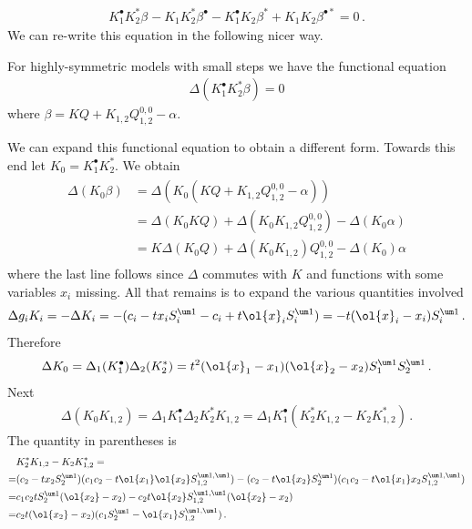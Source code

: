 \begin{align}
	K_1^{\bullet}K_2^{\ast}\beta^{}-K_1^{}K_2^{\ast}\beta^{\bullet}-K_1^{\bullet}K_2^{}\beta^{\ast}+K_1^{}K_2^{}\beta^{\bullet\ast} = 0\,.
\end{align}
We can re-write this equation in the following nicer way.
\begin{theorem} For highly-symmetric models with small steps we have the functional equation
\begin{align}
	\Delta(K_1^\bullet K_2^\ast \beta) = 0
\end{align}
where $\beta = KQ + K_{1,2}Q_{1,2}^{0,0} -\alpha$.
\end{theorem}
We can expand this functional equation to obtain a different form. Towards this end let $K_0 = K_1^\bullet K_2^\ast$. We obtain
\begin{align}\begin{split}
	\Delta(K_0\beta) &= \Delta(K_0(KQ + K_{1,2}Q_{1,2}^{0,0} - \alpha)) \\
	&= \Delta(K_0 KQ) +\Delta(K_0 K_{1,2}Q_{1,2}^{0,0}) - \Delta(K_0\alpha)\\
	&= K\Delta(K_0 Q) + \Delta(K_0 K_{1,2})Q_{1,2}^{0,0} - \Delta(K_0)\alpha
\end{split}\end{align}
where the last line follows since $\Delta$ commutes with $K$ and functions with some variables $x_i$ missing. All that remains is to expand the various quantities involved
\begin{align}
	\Delta g_iK_i = - \Delta K_i = - (c_i-tx_iS_i^{\um 1}-c_i + t\ol{x}_i S_i^{\um 1}) = -t(\ol{x}_i-x_i)S_i^{\um 1}\,.
\end{align}
Therefore
\begin{align}
	\Delta K_0 = \Delta_1 (K_1^\bullet) \Delta_2 (K_2^\ast) = t^2(\ol{x}_1-x_1)(\ol{x}_2-x_2)S_1^{\um 1}S_2^{\um 1}\,.
\end{align}
Next
\begin{align}
	\Delta(K_0 K_{1,2}) = \Delta_1 K_1^\bullet \Delta_2 K_2^\ast K_{1,2} = \Delta_1 K_1^\bullet (K_2^\ast K_{1,2}- K_2 K_{1,2}^\ast)\,.
\end{align}
The quantity in parentheses is
\begin{align}\begin{split}
	&K_2^\ast K_{1,2}- K_2 K_{1,2}^\ast =\\
	=& (c_2-tx_2S_2^{\um 1})(c_1c_2-t\ol{x_1}\ol{x_2}S_{1,2}^{\um 1, \um 1})-(c_2-t\ol{x_2}S_2^{\um 1})(c_1c_2-t\ol{x_1}x_2S_{1,2}^{\um 1, \um 1})\\
	=& c_1c_2tS_2^{\um 1}(\ol{x_2}-x_2) - c_2t\ol{x_2}S_{1,2}^{\um 1, \um 1}(\ol{x_2}-x_2)\\
	=& c_2t(\ol{x_2}-x_2)(c_1S_2^{\um 1}-\ol{x_1}S_{1,2}^{\um 1, \um 1})\,.
\end{split}\end{align}
